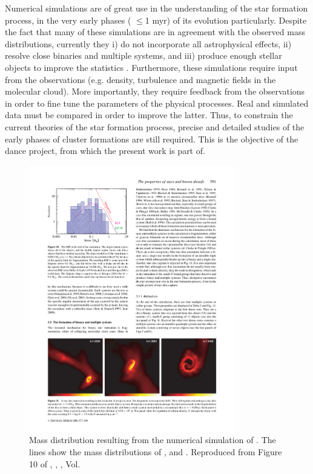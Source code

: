 Numerical simulations are of great use in the understanding of the star formation process, in the very early phases ( $\leq$1 \gls{myr}) of its evolution particularly.  Despite the fact that many of these simulations are in agreement with the observed mass distributions, currently they i) do not incorporate all astrophysical effects, ii) resolve close binaries and multiple systems, and iii) produce enough stellar objects to improve the statistics \citep{Offner2014}. Furthermore, these simulations require input from the observations (e.g. density, turbulence and magnetic fields in the molecular cloud). More importantly, they require feedback from the observations in order to fine tune the parameters of the physical processes. Real and simulated data must be compared in order to improve the latter. Thus, to constrain the current theories of the star formation process, precise and detailed studies of the early phases of cluster formations are still required. This is the objective of the \gls{dance} project, from which the present work is part of.


\begin{figure}[ht!]
\begin{center}
\includegraphics[width=0.8\textwidth]{background/Figures/F10_Bate2003.pdf}
\caption{Mass distribution resulting from the numerical simulation of \citet{2003MNRAS.339..577B}. The lines show the mass distributions of \citet{Salpeter1955}, \citet{1979ApJS...41..513M} and \citet{2001MNRAS.322..231K}. Reproduced from Figure 10 of \citet{2003MNRAS.339..577B}, \textit{}, , Vol. }
\label{fig:IMFBate2003}
\end{center}
\end{figure}

